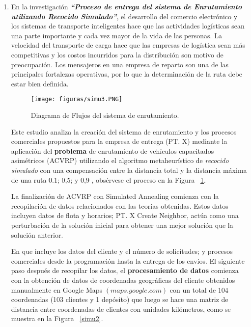 \documentclass[10pt,conference]{IEEEtran}
\begin{document}
\begin{enumerate}
\item En la investigación \textit{\textbf{“Proceso de entrega del sistema de Enrutamiento utilizando Recocido Simulado”}}, \citep{sisw} el desarrollo del comercio electrónico y los sistemas de transporte inteligentes hace que las actividades logísticas sean una parte importante y cada vez mayor de la vida de las personas. La velocidad del transporte de carga hace que las empresas de logística sean más competitivas y los costos incurridos para la distribución son motivo de preocupación. Los mensajeros en una empresa de reparto son una de las principales fortalezas operativas, por lo que la determinación de la ruta debe estar bien definida.

\begin{figure}[H]
\begin{center}
\texttt{[image: figuras/simu3.PNG]}
\caption{Diagrama de Flujos del sistema de enrutamiento.}
\label{simu3} 
\end{center}
\end{figure}

Este estudio analiza la creación del sistema de enrutamiento y los procesos comerciales propuestos para la empresa de entrega (PT. X) mediante la aplicación del \textbf{problema} de enrutamiento de vehículos capacitados asimétricos (ACVRP) utilizando el algoritmo metaheurístico de \textit{recocido simulado} con una compensación entre la distancia total y la distancia máxima de una ruta 0.1; 0,5; y 0,9 , obsérvese el proceso en la Figura ~\ref{simu3}.

La finalización de ACVRP con Simulated Annealing comienza con la recopilación de datos relacionados con las teorías obtenidas. Estos datos incluyen datos de flota y horarios; PT. X Create Neighbor, actúa como una perturbación de la solución inicial para obtener una mejor solución que la solución anterior.

En que incluye los datos del cliente y el número de solicitudes; y procesos comerciales desde la programación hasta la entrega de los envíos. El siguiente paso después de recopilar los datos, el \textbf{procesamiento de datos} comienza con la obtención de datos de coordenadas geográficas del cliente obtenidos manualmente en Google Maps $(maps.google.com)$ con un total de 104 coordenadas (103 clientes y 1 depósito) que luego se hace una matriz de distancia entre coordenadas de clientes con unidades kilómetros, como se muestra en la Figura ~\ref{simu2}.


\end{enumerate}
\end{document}
